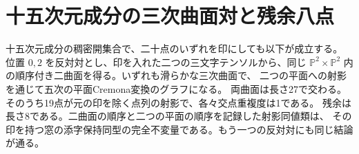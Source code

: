 \section{十五次元成分の三次曲面対と残余八点}
\label{sec:marked-cubic-surface-pairs}
\begin{theorem}\label{thm:marked-cubic-surface-pairs}
十五次元成分の稠密開集合で、二十点のいずれを印にしても以下が成立する。
位置 $0,2$ を反対対とし、印を入れた二つの三文字テンソルから、同じ
$\mathbb P^2\times\mathbb P^2$ 内の順序付き二曲面を得る。いずれも滑らかな三次曲面で、
二つの平面への射影を通じて五次の平面Cremona変換のグラフになる。
両曲面は長さ27で交わる。そのうち19点が元の印を除く点列の射影で、各々交点重複度は1である。
残余は長さ8である。二曲面の順序と二つの平面の順序を記録した射影同値類は、
その印を持つ窓の添字保持同型の完全不変量である。もう一つの反対対にも同じ結論が通る。
\end{theorem}

